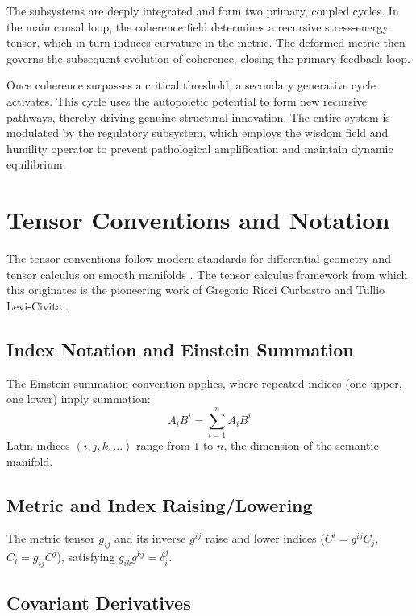The subsystems are deeply integrated and form two primary, coupled cycles. In the main causal loop, the coherence field determines a recursive stress-energy tensor, which in turn induces curvature in the metric. The deformed metric then governs the subsequent evolution of coherence, closing the primary feedback loop. 

Once coherence surpasses a critical threshold, a secondary generative cycle activates. This cycle uses the autopoietic potential to form new recursive pathways, thereby driving genuine structural innovation. The entire system is modulated by the regulatory subsystem, which employs the wisdom field and humility operator to prevent pathological amplification and maintain dynamic equilibrium.

\section{Tensor Conventions and Notation}
\label{sec:tensor_conventions}

The tensor conventions follow modern standards for differential geometry and tensor calculus on smooth manifolds \autocite{Lee2003, MisnerThorneWheeler1973}. The tensor calculus framework from which this originates is the pioneering work of Gregorio Ricci Curbastro and Tullio Levi-Civita \autocite{RicciLeviCivita1901}.

\subsection{Index Notation and Einstein Summation}

The Einstein summation convention \autocite{Einstein1916} applies, where repeated indices (one upper, one lower) imply summation:
\begin{equation}
A_i B^i = \sum_{i=1}^n A_i B^i
\end{equation}
Latin indices \((i,j,k,...)\) range from \(1\) to \(n\), the dimension of the semantic manifold.

\subsection{Metric and Index Raising/Lowering}

The metric tensor \(g_{ij}\) and its inverse \(g^{ij}\) raise and lower indices (\(C^i = g^{ij} C_j\), \(C_i = g_{ij} C^j\)), satisfying \(g_{ik} g^{kj} = \delta_i^j\).

\subsection{Covariant Derivatives}

